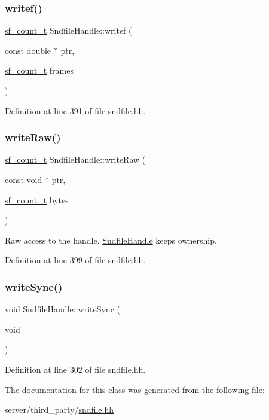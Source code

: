 \subsubsection{\texorpdfstring{writef()}{writef()}\hspace{0.1cm}{\footnotesize\ttfamily [4/4]}}
{\footnotesize\ttfamily \mbox{\hyperlink{sndfile_8h_af2b12fded74bc949f1f1f392a2af4892}{sf\+\_\+count\+\_\+t}} Sndfile\+Handle\+::writef (\begin{DoxyParamCaption}\item[{const double $\ast$}]{ptr,  }\item[{\mbox{\hyperlink{sndfile_8h_af2b12fded74bc949f1f1f392a2af4892}{sf\+\_\+count\+\_\+t}}}]{frames }\end{DoxyParamCaption})\hspace{0.3cm}{\ttfamily [inline]}}



Definition at line 391 of file sndfile.\+hh.

\mbox{\label{class_sndfile_handle_a2557a434e75581b864635088f9de4ee5}} 
\subsubsection{\texorpdfstring{writeRaw()}{writeRaw()}}
{\footnotesize\ttfamily \mbox{\hyperlink{sndfile_8h_af2b12fded74bc949f1f1f392a2af4892}{sf\+\_\+count\+\_\+t}} Sndfile\+Handle\+::write\+Raw (\begin{DoxyParamCaption}\item[{const void $\ast$}]{ptr,  }\item[{\mbox{\hyperlink{sndfile_8h_af2b12fded74bc949f1f1f392a2af4892}{sf\+\_\+count\+\_\+t}}}]{bytes }\end{DoxyParamCaption})\hspace{0.3cm}{\ttfamily [inline]}}

Raw access to the handle. \mbox{\hyperlink{class_sndfile_handle}{Sndfile\+Handle}} keeps ownership. 

Definition at line 399 of file sndfile.\+hh.

\mbox{\label{class_sndfile_handle_a7d7e6ec33d07dfae354c2909fafcdbb2}} 
\subsubsection{\texorpdfstring{writeSync()}{writeSync()}}
{\footnotesize\ttfamily void Sndfile\+Handle\+::write\+Sync (\begin{DoxyParamCaption}\item[{void}]{ }\end{DoxyParamCaption})\hspace{0.3cm}{\ttfamily [inline]}}



Definition at line 302 of file sndfile.\+hh.



The documentation for this class was generated from the following file\+:\begin{DoxyCompactItemize}
\item 
server/third\+\_\+party/\mbox{\hyperlink{sndfile_8hh}{sndfile.\+hh}}\end{DoxyCompactItemize}
